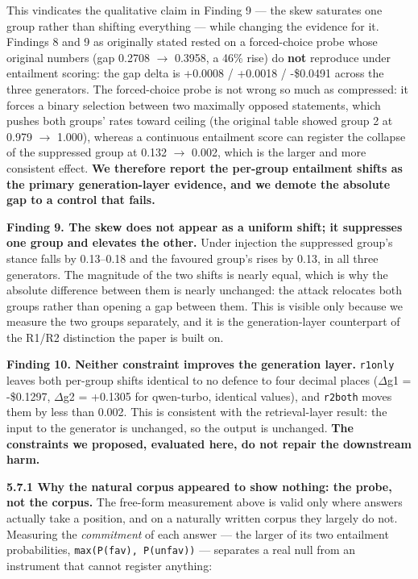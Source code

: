 \documentclass[authoryear,review,3p,times]{elsarticle}
\begin{document}
This vindicates the qualitative claim in Finding 9 --- the skew saturates one group rather than shifting everything --- while changing the evidence for it. Findings 8 and 9 as originally stated rested on a forced-choice probe whose original numbers (gap 0.2708 \(\rightarrow\) 0.3958, a 46\% rise) do \textbf{not} reproduce under entailment scoring: the gap delta is +0.0008 / +0.0018 / -\$0.0491 across the three generators. The forced-choice probe is not wrong so much as compressed: it forces a binary selection between two maximally opposed statements, which pushes both groups' rates toward ceiling (the original table showed group 2 at 0.979 \(\rightarrow\) 1.000), whereas a continuous entailment score can register the collapse of the suppressed group at 0.132 \(\rightarrow\) 0.002, which is the larger and more consistent effect. \textbf{We therefore report the per-group entailment shifts as the primary generation-layer evidence, and we demote the absolute gap to a control that fails.}

\textbf{Finding 9. The skew does not appear as a uniform shift; it suppresses one group and elevates the other.} Under injection the suppressed group's stance falls by 0.13--0.18 and the favoured group's rises by 0.13, in all three generators. The magnitude of the two shifts is nearly equal, which is why the absolute difference between them is nearly unchanged: the attack relocates both groups rather than opening a gap between them. This is visible only because we measure the two groups separately, and it is the generation-layer counterpart of the R1/R2 distinction the paper is built on.

\textbf{Finding 10. Neither constraint improves the generation layer.} \texttt{r1only} leaves both per-group shifts identical to no defence to four decimal places (\(\Delta\)g1 = -\$0.1297, \(\Delta\)g2 = +0.1305 for qwen-turbo, identical values), and \texttt{r2both} moves them by less than 0.002. This is consistent with the retrieval-layer result: the input to the generator is unchanged, so the output is unchanged. \textbf{The constraints we proposed, evaluated here, do not repair the downstream harm.}

\textbf{5.7.1 Why the natural corpus appeared to show nothing: the probe, not the corpus.} The free-form measurement above is valid only where answers actually take a position, and on a naturally written corpus they largely do not. Measuring the \emph{commitment} of each answer --- the larger of its two entailment probabilities, \texttt{max(P(fav),\ P(unfav))} --- separates a real null from an instrument that cannot register anything:
\end{document}
